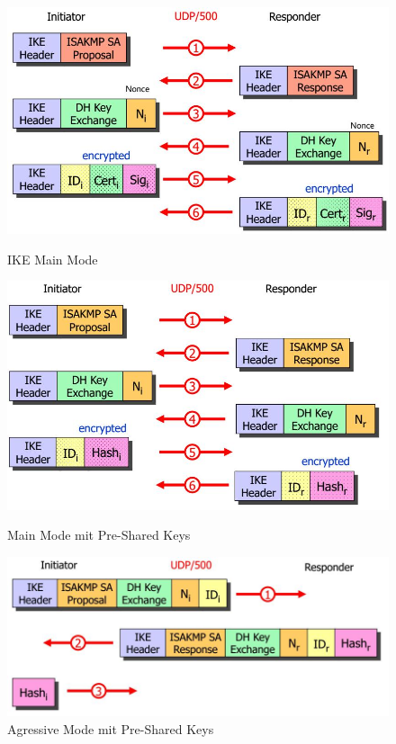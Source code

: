 \begin{figure}[ht!]
	\centering
	\begin{minipage}[t]{0.4\textwidth}
		\centering
		\includegraphics[width=\linewidth]{images/ike_v1_main_mode}
		\caption{IKE Main Mode}
		\label{fig:ikev1mainmode}
	\end{minipage}
	\begin{minipage}[t]{0.4\textwidth}
		\centering
		\includegraphics[width=\linewidth]{images/ike_v1_main_mode_presharedkeys}
		\caption{Main Mode mit Pre-Shared Keys}
		\label{fig:ikev1mainmodepresharedkeys}
	\end{minipage}
	\begin{minipage}[t]{0.4\textwidth}
		\centering
		\includegraphics[width=\linewidth]{images/ike_v1_aggressive_mode_presharedkeys}
		\caption{Agressive Mode mit Pre-Shared Keys}
		\label{fig:ikev1aggressivemodepresharedkeys}
	\end{minipage}
\end{figure}


